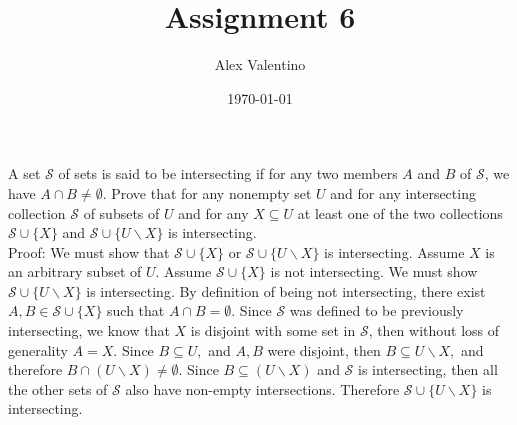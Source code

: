 \documentclass[12pt, letterpaper]{article}
\date{\today}
\author{Alex Valentino}
\title{Assignment 6}
\newcommand{\Ss}{\mathcal{S}}
\begin{document}
	A set $\Ss$ of sets is said to be intersecting if for any two members $A$ and $B$ of $\Ss$, we have $A \cap B \neq \emptyset$.  Prove that for any nonempty set $U$ and for any intersecting collection $\Ss$ of
subsets of $U$ and for any $X \subseteq U$ at least one of the two collections $\Ss \cup \{X\}$ and $\Ss \cup \{U \backslash X\}$ is intersecting.  \\
Proof: We must show that $\Ss \cup \{X\}$ or $\Ss \cup \{U \backslash X\}$ is intersecting.  Assume $X$ is an arbitrary subset of $U$.  Assume $\Ss \cup \{X\}$ is not intersecting.  We must show $\Ss \cup \{U \backslash X\}$ is intersecting.  By definition of being not intersecting, there exist $A,B \in \Ss \cup \{X\}$ such that $A \cap B = \emptyset$.  Since $\Ss$ was defined to be previously intersecting, we know that $X$ is disjoint with some set in $\Ss$, then without loss of generality $A = X.$  Since $B \subseteq U,$ and $A,B$ were disjoint, then $B \subseteq U \backslash X,$ and therefore $B \cap (U \backslash X) \neq \emptyset.$  Since $B \subseteq (U \backslash X)$ and $\Ss$ is intersecting, then all the other sets of $\Ss$ also have non-empty intersections.  Therefore $\Ss \cup \{U \backslash X\}$ is intersecting.  
\end{document}
